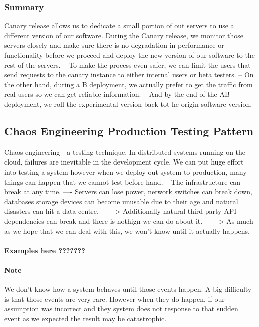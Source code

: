 \documentclass[a4paper, 11pt]{book}
\begin{document}
{    \subsubsection{Summary}
    Canary release allows us to dedicate a small portion of out servers to use a different version of our software.
    During the Canary release, we monitor those servers closely and make sure there is no degradation in performance or functionality before we proceed and deploy the new version of our software to the rest of the servers.
    -- To make the process even safer, we can limit the users that send requests to the canary instance to either internal users or beta testers.
    -- On the other hand, during a B deployment, we actually prefer to get the traffic from real users so we can get reliable information.
    -- And by the end of the AB deployment, we roll the experimental version back tot he origin software version.

    \subsection{Chaos Engineering Production Testing Pattern}
    Chaos engineering - a testing technique.
    In distributed systems running on the cloud, failures are inevitable in the development cycle.
    We can put huge effort into testing a system however when we deploy out system to production, many things can happen that we cannot test before hand.
    -- The infrastructure can break at any time.
    ---- Servers can lose power, network switches can break down, databases storage devices can become unusable due to their age and natural disasters can hit a data centre.
    ------> Additionally natural third party API dependencies can break and there is nothign we can do about it.
    ------> As much as we hope that we can deal with this, we won't know until it actually happens.

    \paragraph{Examples here ???????}

    \paragraph{Note}
    We don't know how a system behaves until those events happen.
    A big difficulty is that those events are very rare.
    However when they do happen, if our assumption was incorrect and they system does not response to that sudden event as we expected the result may be catastrophic.

}
\end{document}
